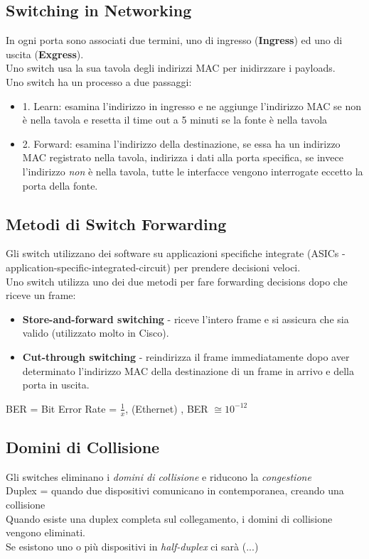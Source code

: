 \documentclass[12pt, a4paper]{article}
\begin{document}
	\subsection*{Switching in Networking}
	In ogni porta sono associati due termini, uno di ingresso (\textbf{Ingress}) ed uno di uscita (\textbf{Exgress}). \\ 
	Uno switch usa la sua tavola degli indirizzi MAC per inidirzzare i payloads. \\
	Uno switch ha un processo a due passaggi:
	\begin{itemize}
		\item 1. Learn: esamina l'indirizzo in ingresso e ne aggiunge l'indirizzo MAC se non è nella tavola e resetta il time out a 5 minuti se la fonte è nella tavola
		\item 2. Forward: esamina l'indirizzo della destinazione, se essa ha un indirizzo MAC registrato nella tavola, indirizza i dati alla porta specifica, se invece l'indirizzo \textit{non} è nella tavola, tutte le interfacce vengono interrogate eccetto la porta della fonte.
	\end{itemize}

	\subsection*{Metodi di Switch Forwarding}
	Gli switch utilizzano dei software su applicazioni specifiche integrate (ASICs - application-specific-integrated-circuit) per prendere decisioni veloci. \\
	Uno switch utilizza uno dei due metodi per fare forwarding decisions dopo che riceve un frame:
	\begin{itemize}
		\item \textbf{Store-and-forward switching} - riceve l'intero frame e si assicura che sia valido (utilizzato molto in Cisco).
		\item \textbf{Cut-through switching} - reindirizza il frame immediatamente dopo aver determinato l'indirizzo MAC della destinazione di un frame in arrivo e della porta in uscita.
	\end{itemize} 
	BER = Bit Error Rate = $\frac{1}{x}$, \quad (Ethernet) \quad, BER $\cong 10^{-12}$ \\
	
	\subsection*{Domini di Collisione}
	
	Gli switches eliminano i \textit{domini di collisione} e riducono la \textit{congestione}
	\\ Duplex = quando due dispositivi comunicano in contemporanea, creando una collisione \\
	Quando esiste una duplex completa sul collegamento, i domini di collisione vengono eliminati. \\
	Se esistono uno o più dispositivi in \textit{half-duplex} ci sarà (...)
	
\end{document}
